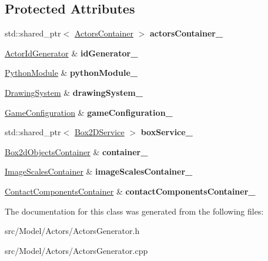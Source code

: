 \subsection*{Protected Attributes}
\begin{DoxyCompactItemize}
\item 
std\+::shared\+\_\+ptr$<$ \hyperlink{classActorsContainer}{Actors\+Container} $>$ {\bfseries actors\+Container\+\_\+}\hypertarget{classActorsGenerator_aed600418e9fea552613186e17f29b125}{}\label{classActorsGenerator_aed600418e9fea552613186e17f29b125}

\item 
\hyperlink{classActorIdGenerator}{Actor\+Id\+Generator} \& {\bfseries id\+Generator\+\_\+}\hypertarget{classActorsGenerator_a9ba70a27e3f86fe57fcdf6d46f3a458e}{}\label{classActorsGenerator_a9ba70a27e3f86fe57fcdf6d46f3a458e}

\item 
\hyperlink{classPythonModule}{Python\+Module} \& {\bfseries python\+Module\+\_\+}\hypertarget{classActorsGenerator_ad5b9bb4d9a81ee9c3b0120665e87feb9}{}\label{classActorsGenerator_ad5b9bb4d9a81ee9c3b0120665e87feb9}

\item 
\hyperlink{classDrawingSystem}{Drawing\+System} \& {\bfseries drawing\+System\+\_\+}\hypertarget{classActorsGenerator_ab411f397987566303f657d4d6c3eddad}{}\label{classActorsGenerator_ab411f397987566303f657d4d6c3eddad}

\item 
\hyperlink{classGameConfiguration}{Game\+Configuration} \& {\bfseries game\+Configuration\+\_\+}\hypertarget{classActorsGenerator_a142b3da2ed4c32b042892560f7cfadf2}{}\label{classActorsGenerator_a142b3da2ed4c32b042892560f7cfadf2}

\item 
std\+::shared\+\_\+ptr$<$ \hyperlink{classBox2DService}{Box2\+D\+Service} $>$ {\bfseries box\+Service\+\_\+}\hypertarget{classActorsGenerator_ac14a3f51f8c6eb95a529416cc49c254b}{}\label{classActorsGenerator_ac14a3f51f8c6eb95a529416cc49c254b}

\item 
\hyperlink{classBox2dObjectsContainer}{Box2d\+Objects\+Container} \& {\bfseries container\+\_\+}\hypertarget{classActorsGenerator_ab75d25e9aa597a0e944884a7dc65741c}{}\label{classActorsGenerator_ab75d25e9aa597a0e944884a7dc65741c}

\item 
\hyperlink{classImageScalesContainer}{Image\+Scales\+Container} \& {\bfseries image\+Scales\+Container\+\_\+}\hypertarget{classActorsGenerator_ab115e37c12f48588ddb0e1328ecd028e}{}\label{classActorsGenerator_ab115e37c12f48588ddb0e1328ecd028e}

\item 
\hyperlink{classContactComponentsContainer}{Contact\+Components\+Container} \& {\bfseries contact\+Components\+Container\+\_\+}\hypertarget{classActorsGenerator_ad80c8ccabe2be13b681e1116635aa387}{}\label{classActorsGenerator_ad80c8ccabe2be13b681e1116635aa387}

\end{DoxyCompactItemize}


The documentation for this class was generated from the following files\+:\begin{DoxyCompactItemize}
\item 
src/\+Model/\+Actors/Actors\+Generator.\+h\item 
src/\+Model/\+Actors/Actors\+Generator.\+cpp\end{DoxyCompactItemize}
